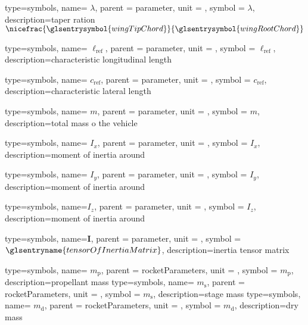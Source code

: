 {type=symbols,
  name= \ensuremath{\lambda},
  parent = {parameter},
  unit = \unexpanded{},
  symbol = \ensuremath{\lambda},
  description={taper ration $\nicefrac{\glsentrysymbol{wingTipChord}}{\glsentrysymbol{wingRootChord}}$}
}

{type=symbols,
  name= \ensuremath{\ell_{\text{ref}}},
  parent = {parameter},
  unit = \unexpanded{\si{\meter}},
  symbol = \ensuremath{\ell_{\text{ref}}},
  description={characteristic longitudinal length}
}

{type=symbols,
  name= \ensuremath{c_{\text{ref}}},
  parent = {parameter},
  unit = \unexpanded{\si{\meter}},
  symbol = \ensuremath{c_{\text{ref}}},
  description={characteristic lateral length}
}


{type=symbols,
  name= \ensuremath{m},
  parent = {parameter},
  unit = \unexpanded{\si{\kilogram}},
  symbol = \ensuremath{m},
  description={total mass o the vehicle}
}

{type=symbols,
  name= \ensuremath{I_{x}},
  parent = {parameter},
  unit = \unexpanded{\si{\kilogram\meter\squared}},
  symbol = \ensuremath{I_{x}},
  description={moment of inertia around }
}


{type=symbols,
  name= \ensuremath{I_{y}},
  parent = {parameter},
  unit = \unexpanded{\si{\kilogram\meter\squared}},
  symbol = \ensuremath{I_{y}},
  description={moment of inertia around }
}

{type=symbols,
  name=\ensuremath{I_{z}},
  parent = {parameter},
  unit = \unexpanded{\si{\kilogram\meter\squared}},
  symbol = \ensuremath{I_{z}},
  description={moment of inertia around }
}


{type=symbols,
  name=\ensuremath{\mathbf{I}},
  parent = {parameter},
  unit = \unexpanded{\si{\kilogram\meter\squared}},
  symbol = \ensuremath{\glsentryname{tensorOfInertiaMatrix}},
  description={inertia tensor matrix}
}

{type=symbols,
  name= \ensuremath{m_\mathrm{p}},
  parent = {rocketParameters},
  unit = \unexpanded{\si{\kilogram}},
  symbol = \ensuremath{m_\mathrm{p}},
  description={propellant mass}
}
{type=symbols,
  name= \ensuremath{m_\mathrm{s}},
  parent = {rocketParameters},
  unit = \unexpanded{\si{\kilogram}},
  symbol = \ensuremath{m_\mathrm{s}},
  description={stage mass}
}
{type=symbols,
  name= \ensuremath{{m}_\mathrm{d}},
  parent = {rocketParameters},
  unit = \unexpanded{\si{\kilogram}},
  symbol = \ensuremath{{m}_\mathrm{d}},
  description={dry mass}
}

